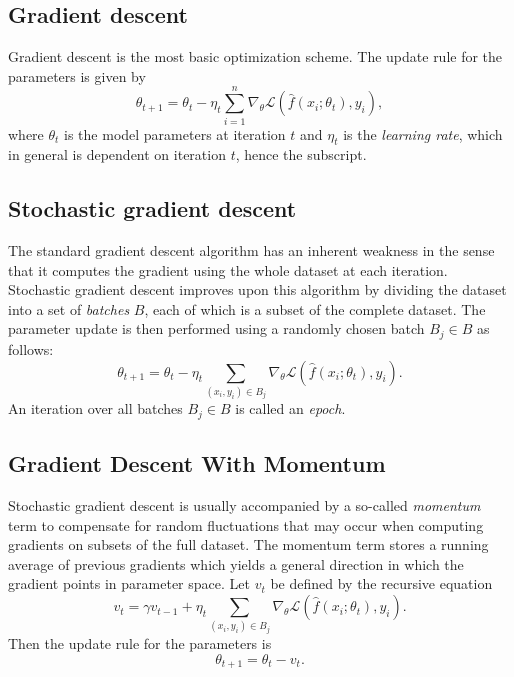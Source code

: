 \subsection{Gradient descent}
Gradient descent is the most basic optimization scheme. The update rule for the parameters is given by 
\begin{equation}
	\theta_{t+1} = \theta_t - \eta_t \sum_{i=1}^n \nabla_\theta \mathcal{L}(\hat{f}(x_i; \theta_t), y_i),
\end{equation}
where $\theta_t$ is the model parameters at iteration $t$ and $\eta_t$ is the \textit{learning rate}, 
which in general is dependent on iteration $t$, hence the subscript.
\subsection{Stochastic gradient descent}
The standard gradient descent algorithm has an inherent weakness in the sense that it computes the gradient using the whole dataset
at each iteration. Stochastic gradient descent improves upon this algorithm by dividing the dataset into a set of \textit{batches} $B$,
each of which is a subset of the complete dataset. The parameter update is then performed using a randomly chosen batch $B_j \in B$ as follows:
\begin{equation}
	\theta_{t+1} = \theta_t - \eta_t \sum_{(x_i, y_i) \in B_j} \nabla_\theta \mathcal{L}(\hat{f}(x_i; \theta_t), y_i).
\end{equation}
An iteration over all batches $B_j \in B$ is called an \textit{epoch}. 

\subsection{Gradient Descent With Momentum}
Stochastic gradient descent is usually accompanied by a so-called \textit{momentum} term to compensate for random
fluctuations that may occur when computing gradients on subsets of the full dataset. The momentum term stores a running average of
previous gradients which yields a general direction in which the gradient points in parameter space. 
Let $v_t$ be defined by the recursive equation 
\begin{equation}
	v_t = \gamma v_{t-1} + \eta_t \sum_{(x_i, y_i) \in B_j} \nabla_\theta \mathcal{L}(\hat{f}(x_i; \theta_t), y_i).
\end{equation}
Then the update rule for the parameters is
\begin{equation}
	\theta_{t+1} = \theta_t - v_t.
\end{equation}

